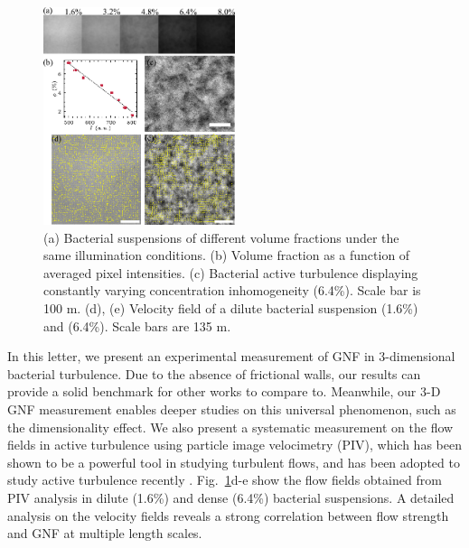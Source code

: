 \documentclass[twocolumn,aps,prl,amsmath,amssymb,longbibliography]{revtex4-2}
\begin{document}
\begin{figure}[ht]
\begin{center}
\includegraphics[width=0.5\textwidth]{figures/fig-1/v3.pdf}
\caption[Experimental details]
{
(a) Bacterial suspensions of different volume fractions under the same illumination conditions.
(b) Volume fraction as a function of averaged pixel intensities.
(c) Bacterial active turbulence displaying constantly varying concentration inhomogeneity (6.4\%). Scale bar is 100 \textmu m.
(d), (e) Velocity field of a dilute bacterial suspension (1.6\%) and (6.4\%). Scale bars are 135 \textmu m.
}
\label{fig:1}
\end{center}
\end{figure}

In this letter, we present an experimental measurement of GNF in 3-dimensional bacterial turbulence. Due to the absence of frictional walls, our results can provide a solid benchmark for other works to compare to. Meanwhile, our 3-D GNF measurement enables deeper studies on this universal phenomenon, such as the dimensionality effect. We also present a systematic measurement on the flow fields in active turbulence using particle image velocimetry (PIV), which has been shown to be a powerful tool in studying turbulent flows, and has been adopted to study active turbulence recently
\cite{Ishikawa2011, Wensink2012, Sokolov2012, Sanchez2012, Dunkel2013a, Schaller2013, Peng2020}. Fig.~\ref{fig:1}d-e show the flow fields obtained from PIV analysis in dilute (1.6\%) and dense (6.4\%) bacterial suspensions. A detailed analysis on the velocity fields reveals a strong correlation between flow strength and GNF at multiple length scales.
\end{document}
